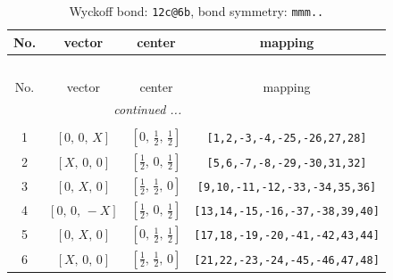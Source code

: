 \documentclass[fleqn,8pt]{jsarticle}
\begin{document}
\begin{longtable}{cccc}
\caption{Wyckoff bond: {\tt 12c@6b}, bond symmetry: {\tt mmm..}}
 \\
 \hline \hline
No. & vector & center & mapping \\ \hline \endfirsthead

\multicolumn{3}{l}{\tablename\ \thetable{}} \\
 \hline \hline
No. & vector & center & mapping \\ \hline \endhead

 \hline \hline
\multicolumn{3}{r}{\footnotesize\it continued ...} \\ \endfoot

 \hline \hline
\multicolumn{3}{r}{} \\ \endlastfoot

1 & $\left[ 0,\, 0,\, X \right]$ & $\left[ 0,\, \frac{1}{2},\, \frac{1}{2} \right]$ & {\tt [1,2,-3,-4,-25,-26,27,28]} \\ \hline
2 & $\left[ X,\, 0,\, 0 \right]$ & $\left[ \frac{1}{2},\, 0,\, \frac{1}{2} \right]$ & {\tt [5,6,-7,-8,-29,-30,31,32]} \\ \hline
3 & $\left[ 0,\, X,\, 0 \right]$ & $\left[ \frac{1}{2},\, \frac{1}{2},\, 0 \right]$ & {\tt [9,10,-11,-12,-33,-34,35,36]} \\ \hline
4 & $\left[ 0,\, 0,\, - X \right]$ & $\left[ \frac{1}{2},\, 0,\, \frac{1}{2} \right]$ & {\tt [13,14,-15,-16,-37,-38,39,40]} \\ \hline
5 & $\left[ 0,\, X,\, 0 \right]$ & $\left[ 0,\, \frac{1}{2},\, \frac{1}{2} \right]$ & {\tt [17,18,-19,-20,-41,-42,43,44]} \\ \hline
6 & $\left[ X,\, 0,\, 0 \right]$ & $\left[ \frac{1}{2},\, \frac{1}{2},\, 0 \right]$ & {\tt [21,22,-23,-24,-45,-46,47,48]} \\
\end{longtable}
\renewcommand{\arraystretch}{1.2}
\end{document}
